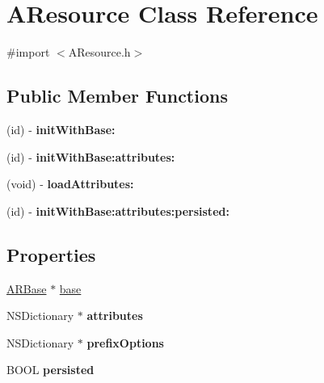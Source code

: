 \hypertarget{a00002}{
\section{\-A\-Resource \-Class \-Reference}
\label{a00002}
}


{\ttfamily \#import $<$\-A\-Resource.\-h$>$}

\subsection*{\-Public \-Member \-Functions}
\begin{DoxyCompactItemize}
\item 
\hypertarget{a00002_ae8558e0345b97c3a12b5796a53302ccb}{
(id) -\/ {\bfseries init\-With\-Base\-:}}
\label{a00002_ae8558e0345b97c3a12b5796a53302ccb}

\item 
\hypertarget{a00002_a8c018c41428f849642fbcaf4d8fac20e}{
(id) -\/ {\bfseries init\-With\-Base\-:attributes\-:}}
\label{a00002_a8c018c41428f849642fbcaf4d8fac20e}

\item 
\hypertarget{a00002_ab74cb646a5f33f53e44b8837f403a42e}{
(void) -\/ {\bfseries load\-Attributes\-:}}
\label{a00002_ab74cb646a5f33f53e44b8837f403a42e}

\item 
\hypertarget{a00002_a07bffbc6341ff76d940622b9db4f37db}{
(id) -\/ {\bfseries init\-With\-Base\-:attributes\-:persisted\-:}}
\label{a00002_a07bffbc6341ff76d940622b9db4f37db}

\end{DoxyCompactItemize}
\subsection*{\-Properties}
\begin{DoxyCompactItemize}
\item 
\hyperlink{a00001}{\-A\-R\-Base} $\ast$ \hyperlink{a00002_a30040e9c47eb757de009e84ef1afb538}{base}
\item 
\hypertarget{a00002_a41b90fcbde29cf78475969192bd6aa77}{
\-N\-S\-Dictionary $\ast$ {\bfseries attributes}}
\label{a00002_a41b90fcbde29cf78475969192bd6aa77}

\item 
\hypertarget{a00002_a5c2f5f2e7bc77d1a62e6ace01de84a62}{
\-N\-S\-Dictionary $\ast$ {\bfseries prefix\-Options}}
\label{a00002_a5c2f5f2e7bc77d1a62e6ace01de84a62}

\item 
\hypertarget{a00002_a10da03073a25a2bfa0cee9bf2b7e0041}{
\-B\-O\-O\-L {\bfseries persisted}}
\label{a00002_a10da03073a25a2bfa0cee9bf2b7e0041}

\end{DoxyCompactItemize}


